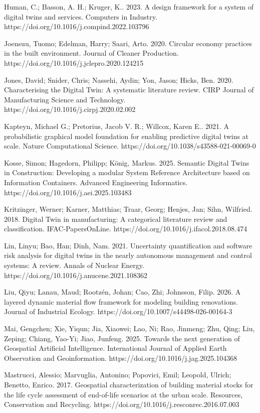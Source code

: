 Human, C.; Basson, A. H.; Kruger, K.. 2023. A design framework for a system of digital twins and services. Computers in Industry. https://doi.org/10.1016/j.compind.2022.103796

Joensuu, Tuomo; Edelman, Harry; Saari, Arto. 2020. Circular economy practices in the built environment. Journal of Cleaner Production. https://doi.org/10.1016/j.jclepro.2020.124215

Jones, David; Snider, Chris; Nassehi, Aydin; Yon, Jason; Hicks, Ben. 2020. Characterising the Digital Twin: A systematic literature review. CIRP Journal of Manufacturing Science and Technology. https://doi.org/10.1016/j.cirpj.2020.02.002

Kapteyn, Michael G.; Pretorius, Jacob V. R.; Willcox, Karen E.. 2021. A probabilistic graphical model foundation for enabling predictive digital twins at scale. Nature Computational Science. https://doi.org/10.1038/s43588-021-00069-0

Kosse, Simon; Hagedorn, Philipp; König, Markus. 2025. Semantic Digital Twins in Construction: Developing a modular System Reference Architecture based on Information Containers. Advanced Engineering Informatics. https://doi.org/10.1016/j.aei.2025.103483

Kritzinger, Werner; Karner, Matthias; Traar, Georg; Henjes, Jan; Sihn, Wilfried. 2018. Digital Twin in manufacturing: A categorical literature review and classification. IFAC-PapersOnLine. https://doi.org/10.1016/j.ifacol.2018.08.474

Lin, Linyu; Bao, Han; Dinh, Nam. 2021. Uncertainty quantification and software risk analysis for digital twins in the nearly autonomous management and control systems: A review. Annals of Nuclear Energy. https://doi.org/10.1016/j.anucene.2021.108362

Liu, Qiyu; Lanau, Maud; Rootzén, Johan; Cao, Zhi; Johnsson, Filip. 2026. A layered dynamic material flow framework for modeling building renovations. Journal of Industrial Ecology. https://doi.org/10.1007/s44498-026-00164-3

Mai, Gengchen; Xie, Yiqun; Jia, Xiaowei; Lao, Ni; Rao, Jinmeng; Zhu, Qing; Liu, Zeping; Chiang, Yao-Yi; Jiao, Junfeng. 2025. Towards the next generation of Geospatial Artificial Intelligence. International Journal of Applied Earth Observation and Geoinformation. https://doi.org/10.1016/j.jag.2025.104368

Mastrucci, Alessio; Marvuglia, Antonino; Popovici, Emil; Leopold, Ulrich; Benetto, Enrico. 2017. Geospatial characterization of building material stocks for the life cycle assessment of end-of-life scenarios at the urban scale. Resources, Conservation and Recycling. https://doi.org/10.1016/j.resconrec.2016.07.003


